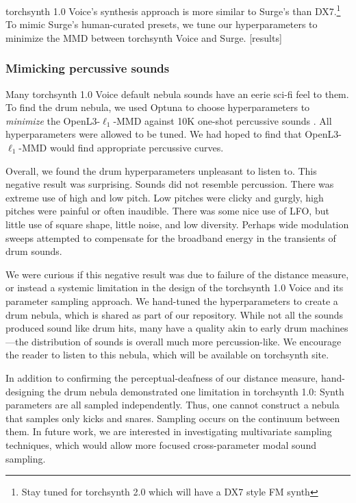 torchsynth 1.0 Voice's synthesis approach is more similar to Surge's than DX7.\footnote{Stay tuned for torchsynth 2.0 which will have a DX7 style FM synth}
To mimic Surge's human-curated presets, we tune our hyperparameters to minimize the MMD between torchsynth Voice and Surge. [results]

\subsubsection{Mimicking percussive sounds}
\fi

Many torchsynth 1.0 Voice default nebula sounds have an eerie sci-fi feel to them.
To find the drum nebula, we used Optuna to choose hyperparameters to {\em minimize} the OpenL3-$\ell_1$-MMD against 10K one-shot percussive sounds \cite{ramires2020}. All hyperparameters were allowed to be tuned.
We had hoped to find that OpenL3-$\ell_1$-MMD would find appropriate percussive curves.

Overall, we found the drum hyperparameters unpleasant to listen to. This negative result was surprising. Sounds did not resemble percussion. There was extreme use of high and low pitch. Low pitches were clicky and gurgly, high pitches were painful or often inaudible. There was some nice use of LFO, but little use of square shape, little noise, and low diversity. Perhaps wide modulation sweeps attempted to compensate for the broadband energy in the transients of drum sounds.

We were curious if this negative result was due to failure of the distance measure, or instead a systemic limitation in the design of the torchsynth 1.0 Voice and its parameter sampling approach. We hand-tuned the hyperparameters to create a drum nebula, which is shared as part of our repository. While not all the sounds produced sound like drum hits, many have a quality akin to early drum machines---the distribution of sounds is overall much more percussion-like. We encourage the reader to listen to this nebula, which will be available on torchsynth site.

In addition to confirming the perceptual-deafness of our distance measure, hand-designing the drum nebula demonstrated one limitation in torchsynth 1.0: Synth parameters are all sampled independently. Thus, one cannot construct a nebula that samples only kicks and snares. Sampling occurs on the continuum between them. In future work, we are interested in investigating multivariate sampling techniques, which would allow more focused cross-parameter modal sound sampling.

